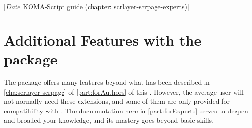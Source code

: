 %
%
%
%
%
%
%
%
% 
%
%
%
%

%
                 [$Date$
                  KOMA-Script guide (chapter: scrlayer-scrpage-experts)]


\chapter[{Additional Features of \Package{scrlayer-scrpage}}]
  {Additional Features with
    the  package}
%
\BeginIndexGroup
{}%
The  package offers many features beyond what has
been described in \autoref{cha:scrlayer-scrpage} of \autoref{part:forAuthors}
of this . However, the average user will not normally need
these extensions, and some of them are only provided for compatibility with
. The documentation here in \autoref{part:forExperts} serves
to deepen and broaded your knowledge, and its mastery goes beyond basic
skills.

